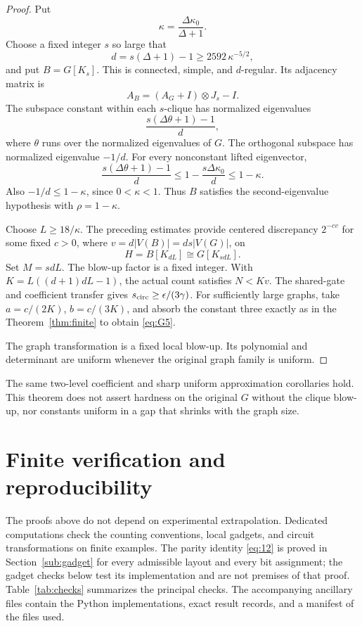 \documentclass[11pt]{article}
\theoremstyle{definition}
\theoremstyle{remark}
\numberwithin{equation}{section}
\begin{document}
\begin{proof} Put
\[
                  \kappa=\frac{\Delta\kappa_0}{\Delta+1}.
\]
Choose a fixed integer \(s\) so large that
\[
        d=s(\Delta+1)-1\ge2592\,\kappa^{-5/2},
\]
and put \(B=G[K_s]\). This is connected, simple, and
\(d\)-regular. Its adjacency matrix is
\[
                  A_B=(A_G+I)\otimes J_s-I.
\]
The subspace constant within each \(s\)-clique has normalized
eigenvalues
\[
                 \frac{s(\Delta\theta+1)-1}{d},
\]
where \(\theta\) runs over the normalized eigenvalues of \(G\).
The orthogonal subspace has normalized eigenvalue \(-1/d\).
For every nonconstant lifted eigenvector,
\[
 \frac{s(\Delta\theta+1)-1}{d}
       \le1-\frac{s\Delta\kappa_0}{d}
       \le1-\kappa.
\]
Also \(-1/d\le1-\kappa\), since \(0<\kappa<1\).
Thus \(B\) satisfies the second-eigenvalue hypothesis with
\(\rho=1-\kappa\).

Choose \(L\ge18/\kappa\). The preceding estimates provide
centered discrepancy \(2^{-cv}\) for some fixed \(c>0\),
where \(v=d|V(B)|=ds|V(G)|\), on
\[
                  H=B[K_{dL}]\cong G[K_{sdL}].
\]
Set \(M=sdL\). The blow-up factor is a fixed integer.
With \(K=L((d+1)dL-1)\), the actual count satisfies \(N<Kv\).
The shared-gate and coefficient transfer gives
\(s_{\rm circ}\ge\epsilon/(3\gamma)\).
For sufficiently large graphs, take
\(a=c/(2K)\), \(b=c/(3K)\), and absorb the constant three
exactly as in the Theorem~\ref{thm:finite} to obtain \eqref{eq:G5}.

The graph transformation is a fixed local blow-up. Its
polynomial and determinant are uniform whenever the original
graph family is uniform.\end{proof}

The same two-level coefficient and sharp uniform approximation
corollaries hold. This theorem does not assert hardness on
the original \(G\) without the clique blow-up, nor constants
uniform in a gap that shrinks with the graph size.

\section{Finite verification and reproducibility}\label{app:verification}

The proofs above do not depend on experimental extrapolation.
Dedicated computations check the counting conventions, local
gadgets, and circuit transformations on finite examples.
The parity identity \eqref{eq:12} is proved in
Section~\ref{sub:gadget} for every admissible layout and every
bit assignment; the gadget checks below test its implementation
and are not premises of that proof.
Table~\ref{tab:checks} summarizes the principal checks. The accompanying
ancillary files contain the Python implementations, exact result
records, and a manifest of the files used.
\end{document}
